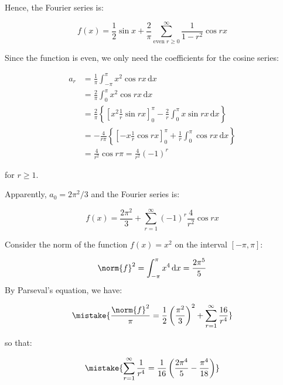 \documentclass[12pt]{article}
\begin{document}
Hence, the Fourier series is:

\begin{equation}
    f(x) = \frac{1}{2} \sin{x} + \frac{2}{\pi} \sum_{\text{even }r \ge 0}^{\infty} \frac{1}{1 - r^{2}} \cos{rx}
\end{equation}

Since the function is even, we only need the coefficients for the cosine series:

\begin{equation}
\begin{split}
    a_{r} &= \frac{1}{\pi} \int_{-\pi}^{\pi} x^{2} \cos{rx} \, \mathrm{d}x \\
    &= \frac{2}{\pi} \int_{0}^{\pi} x^{2} \cos{rx} \, \mathrm{d}x \\
    &= \frac{2}{\pi} \left\{ \left[ x^{2} \frac{1}{r} \sin{rx} \right]_{0}^{\pi} -  \frac{2}{r} \int_{0}^{\pi} x \sin{rx} \, \mathrm{d}x \right\} \\
    &= -\frac{4}{r\pi} \left\{ \left[ -x \frac{1}{r} \cos{rx} \right]_{0}^{\pi} + \frac{1}{r} \int_{0}^{\pi} \cos{rx} \, \mathrm{d}x \right\} \\
    &= \frac{4}{r^{2}} \cos{r\pi} = \frac{4}{r^{2}} (-1)^{r}
\end{split}
\end{equation}

for $r \ge 1$.

Apparently, $a_{0} = 2\pi^{2}/3$ and the Fourier series is:

\begin{equation}
    f(x) = \frac{2\pi^{2}}{3} + \sum_{r = 1}^{\infty} (-1)^{r} \frac{4}{r^{2}} \cos{rx}
\end{equation}

Consider the norm of the function $f(x) = x^{2}$ on the interval $[-\pi, \pi]$:

\begin{equation}
    \norm{f}^{2} = \int_{-\pi}^{\pi} x^{4} \, \mathrm{d}x = \frac{2\pi^{5}}{5}
\end{equation}
By Parseval's equation, we have:

\begin{equation}
    \mistake{
    \frac{\norm{f}^{2}}{\pi} = \frac{1}{2} \left( \frac{\pi^{2}}{3} \right)^{2} + \sum_{r = 1}^{\infty} \frac{16}{r^{4}}
    }
\end{equation}

so that:

\begin{equation}
    \mistake{
    \sum_{r = 1}^{\infty} \frac{1}{r^{4}} = \frac{1}{16} \left( \frac{2\pi^{4}}{5} - \frac{\pi^{4}}{18} \right)
    }
\end{equation}
\end{document}
